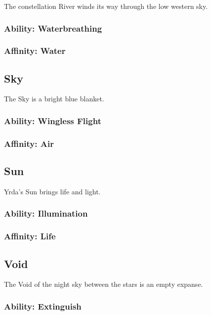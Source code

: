 \begin{multicols}{2}
The constellation River winds its way through the low western sky.

\subsubsection{Ability: Waterbreathing}

\subsubsection{Affinity: Water}

\subsection{Sky}

The Sky is a bright blue blanket.

\subsubsection{Ability: Wingless Flight}

\subsubsection{Affinity: Air}

\subsection{Sun}

Yrda's Sun brings life and light.

\subsubsection{Ability: Illumination}

\subsubsection{Affinity: Life}

\subsection{Void}

The Void of the night sky between the stars is an empty expanse.

\subsubsection{Ability: Extinguish}


\end{multicols}
